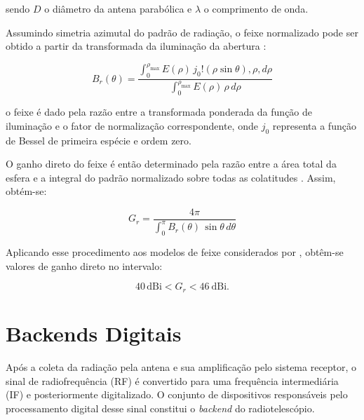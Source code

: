 sendo \(D\) o diâmetro da antena parabólica e \(\lambda\) o comprimento de onda.

Assumindo simetria azimutal do padrão de radiação, o feixe normalizado pode ser obtido a partir da transformada da iluminação da abertura \cite{harper2018potential}:

\begin{equation}
B_r(\theta) =
\frac{\displaystyle \int_0^{\rho_{\max}} E(\rho)\,
j_0!\left(\rho \sin\theta\right),
\rho, d\rho}
{\displaystyle \int_0^{\rho_{\max}} E(\rho)\,
\rho \, d\rho}
\label{eq:beam_pattern}
\end{equation}

o feixe é dado pela razão entre a transformada ponderada da função de iluminação e o fator de normalização correspondente, onde \(j_0\) representa a função de Bessel de primeira espécie e ordem zero.

O ganho direto do feixe é então determinado pela razão entre a área total da esfera e a integral do padrão normalizado sobre todas as colatitudes \cite{harper2018potential}. Assim, obtém-se:

\begin{equation}
G_r =
\frac{4\pi}
{\displaystyle \int_0^{\pi}
B_r(\theta) \,
\sin\theta \, d\theta}
\label{eq:beam_gain}
\end{equation}

Aplicando esse procedimento aos modelos de feixe considerados por \cite{harper2018potential}, obtêm-se valores de ganho direto no intervalo:

\begin{equation}
40 \, \text{dBi} <  G_r  <  46 \ \text{dBi}.
\end{equation}





\section{Backends Digitais}

Após a coleta da radiação pela antena e sua amplificação pelo sistema receptor, o sinal de radiofrequência (RF) é convertido para uma frequência intermediária (IF) e posteriormente digitalizado. O conjunto de dispositivos responsáveis pelo processamento digital desse sinal constitui o \textit{backend} do radiotelescópio.

